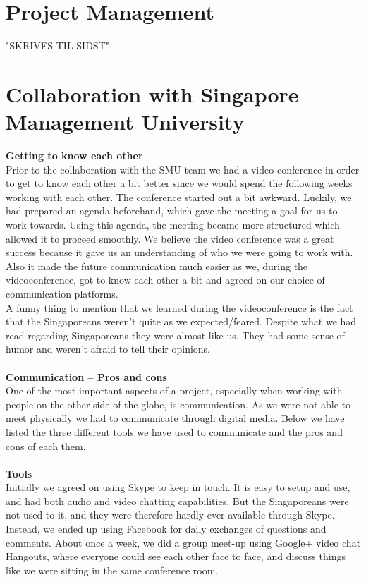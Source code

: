 \documentclass[10pt,a4paper]{article}
\begin{document}
\section{Project Management}
"SKRIVES TIL SIDST"
\section{Collaboration with Singapore Management University}

{\bfseries Getting to know each other}\\
Prior to the collaboration with the SMU team we had a video conference in order to get to know each other a bit better since we would spend the following weeks working with each other. The conference started out a bit awkward. Luckily, we had prepared an agenda beforehand, which gave the meeting a goal for us to work towards. Using this agenda, the meeting became more structured which allowed it to proceed smoothly. We believe the video conference was a great success because it gave us an understanding of who we were going to work with. Also it made the future communication much easier as we, during the videoconference, got to know each other a bit and agreed on our choice of communication platforms.\\
A funny thing to mention that we learned during the videoconference is the fact that the Singaporeans weren’t quite as we expected/feared. Despite what we had read regarding Singaporeans they were almost like us. They had some sense of humor and weren’t afraid to tell their opinions. \\\\
{\bfseries Communication – Pros and cons}\\
One of the most important aspects of a project, especially when working with people on the other side of the globe, is communication. As we were not able to meet physically we had to communicate through digital media. Below we have listed the three different tools we have used to communicate and the pros and cons of each them. \\\\
{\bfseries Tools}\\
Initially we agreed on using Skype to keep in touch. It is easy to setup and use, and had both audio and video chatting capabilities. But the Singaporeans were not used to it, and they were therefore hardly ever available through Skype. Instead, we ended up using Facebook for daily exchanges of questions and comments. About once a week, we did a group meet-up using Google+ video chat Hangouts, where everyone could see each other face to face, and discuss things like we were sitting in the same conference room.\\\\
\end{document}
